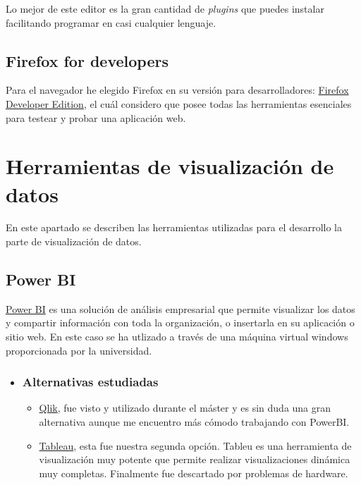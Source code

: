 Lo mejor de este editor es la gran cantidad de \textit{plugins} que puedes instalar facilitando programar en casi cualquier lenguaje.


\subsection{Firefox for developers}\label{herramientas_firefox}
Para el navegador he elegido Firefox en su versión para desarrolladores: \href{https://www.mozilla.org/es-ES/firefox/developer}{Firefox Developer Edition}, el cuál considero que posee todas las herramientas esenciales para testear y probar una aplicación web.


\section{Herramientas de visualización de datos}\label{herramientasdataviz}
En este apartado se describen las herramientas utilizadas para el desarrollo la parte de visualización de datos.

\subsection{Power BI}
\href{https://powerbi.microsoft.com}{Power BI} es una solución de análisis empresarial que permite visualizar los datos y compartir información con toda la organización, o insertarla en su aplicación o sitio web. En este caso se ha utlizado a través de una máquina virtual windows proporcionada por la universidad.

\begin{itemize}
	\item \subsubsection{Alternativas estudiadas}
	\begin{itemize}
		\item \href{https://www.qlik.com/us}{Qlik}, fue visto y utilizado durante el máster y es sin duda una gran alternativa aunque me encuentro más cómodo trabajando con PowerBI.
		\item \href{https://www.tableau.com}{Tableau}, esta fue nuestra  segunda opción. Tableu es una herramienta de visualización muy potente que permite realizar visualizaciones dinámica muy completas. Finalmente fue descartado por problemas de hardware. 
	\end{itemize}
\end{itemize}

